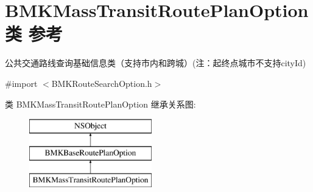 \hypertarget{interface_b_m_k_mass_transit_route_plan_option}{}\section{B\+M\+K\+Mass\+Transit\+Route\+Plan\+Option类 参考}
\label{interface_b_m_k_mass_transit_route_plan_option}


公共交通路线查询基础信息类（支持市内和跨城）(注：起终点城市不支持city\+Id)  




{\ttfamily \#import $<$B\+M\+K\+Route\+Search\+Option.\+h$>$}

类 B\+M\+K\+Mass\+Transit\+Route\+Plan\+Option 继承关系图\+:\begin{figure}[H]
\begin{center}
\leavevmode
\includegraphics[height=3.000000cm]{interface_b_m_k_mass_transit_route_plan_option}
\end{center}
\end{figure}
